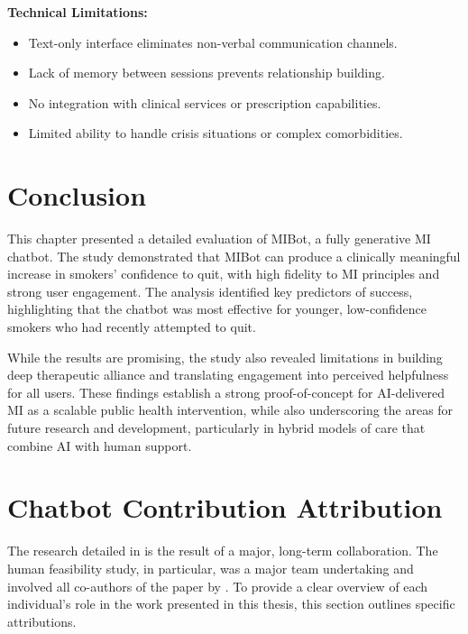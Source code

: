\textbf{Technical Limitations:}
\begin{itemize}
	\item Text-only interface eliminates non-verbal communication channels.
	\item Lack of memory between sessions prevents relationship building.
	\item No integration with clinical services or prescription capabilities.
	\item Limited ability to handle crisis situations or complex comorbidities.
\end{itemize}

\section{Conclusion}
\label{sec:conclusion}

This chapter presented a detailed evaluation of MIBot, a fully generative MI chatbot. The study demonstrated that MIBot can produce a clinically meaningful increase in smokers' confidence to quit, with high fidelity to MI principles and strong user engagement. The analysis identified key predictors of success, highlighting that the chatbot was most effective for younger, low-confidence smokers who had recently attempted to quit.

While the results are promising, the study also revealed limitations in building deep therapeutic alliance and translating engagement into perceived helpfulness for all users. These findings establish a strong proof-of-concept for AI-delivered MI as a scalable public health intervention, while also underscoring the areas for future research and development, particularly in hybrid models of care that combine AI with human support.


\section*{Chatbot Contribution Attribution}

The research detailed in  is the result of a major, long-term collaboration. The human feasibility study, in particular, was a major team undertaking and involved all co-authors of the paper by \citet{mahmood-etal-2025-fully}. To provide a clear overview of each individual's role in the work presented in this thesis, this section outlines specific attributions.

